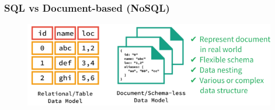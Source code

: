 \documentclass[10pt, compress]{beamer}
\begin{document}
\begin{frame}[fragile]
  \frametitle{SQL vs Document-based (NoSQL)}

  \begin{figure}[ht]
    \centering
    \vspace{-25pt}
    \includegraphics[width=11cm]{include/literature-nosql.png}
    \vspace{-10pt}
    \label{fig:literature-nosql}
  \end{figure}

\end{frame}



\end{document}
